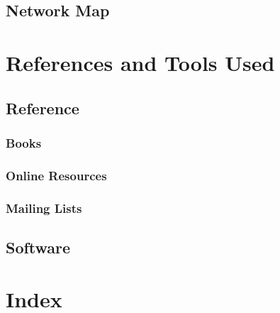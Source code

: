 \documentclass[a4paper,12pt]{report}
\begin{document}
\section{Network Map}




\chapter{References and Tools Used}

\section{Reference}

\subsection{Books}



\subsection{Online Resources}



\subsection{Mailing Lists}



\section{Software}




\chapter{Index}

\printindex 
\end{document}

